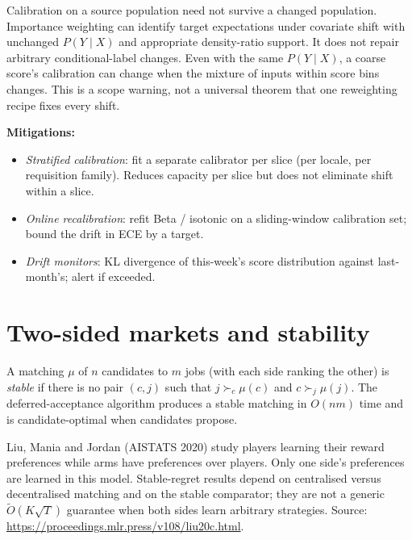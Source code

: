 \documentclass[11pt,oneside]{scrbook}
\begin{document}
\begin{remark}
Calibration on a source population need not survive a changed population.
Importance weighting can identify target expectations under covariate
shift with unchanged $P(Y\mid X)$ and appropriate density-ratio support.
It does not repair arbitrary conditional-label changes. Even with the same
$P(Y\mid X)$, a coarse score's calibration can change when the mixture
of inputs within score bins changes. This is a scope warning, not a
universal theorem that one reweighting recipe fixes every shift.
\end{remark}



\textbf{Mitigations:}
\begin{itemize}\setlength\itemsep{1pt}
  \item \emph{Stratified calibration}: fit a separate calibrator per slice
        (per locale, per requisition family). Reduces capacity per slice
        but does not eliminate shift within a slice.
  \item \emph{Online recalibration}: refit Beta / isotonic on a
        sliding-window calibration set; bound the drift in ECE by a target.
  \item \emph{Drift monitors}: KL divergence of this-week's score
        distribution against last-month's; alert if exceeded.
\end{itemize}

\section{Two-sided markets and stability}

\begin{definition}
A matching $\mu$ of $n$ candidates to $m$ jobs (with each side ranking the
other) is \emph{stable} if there is no pair $(c, j)$ such that
$j \succ_c \mu(c)$ and $c \succ_j \mu(j)$. The deferred-acceptance
algorithm produces a stable matching in $O(nm)$ time and is
candidate-optimal when candidates propose.
\end{definition}

\begin{remark}
Liu, Mania and Jordan (AISTATS 2020) study players learning their reward
preferences while arms have preferences over players. Only one side's
preferences are learned in this model. Stable-regret results depend on
centralised versus decentralised matching and on the stable comparator;
they are not a generic $\widetilde O(K\sqrt T)$ guarantee when both
sides learn arbitrary strategies. Source:
\url{https://proceedings.mlr.press/v108/liu20c.html}.
\end{remark}
\end{document}
